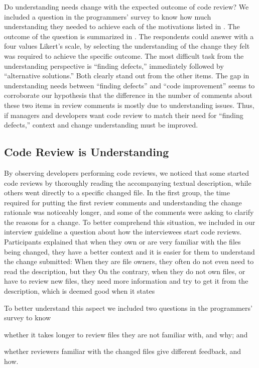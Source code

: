 Do understanding needs change with the expected outcome of code review? We included a question in the programmers’ survey to know how much understanding they needed to achieve each of the motivations listed in . The outcome of the question is summarized in . The respondents could answer with a four values Likert's scale, by selecting the understanding of the change they felt was required to achieve the specific outcome. The most difficult task from the understanding perspective is ``finding defects,'' immediately followed by ``alternative solutions.'' Both clearly stand out from the other items. The gap in understanding needs between ``finding defects'' and ``code improvement'' seems to corroborate our hypothesis that the difference in the number of comments about these two items in review comments is mostly due to understanding issues. Thus, if managers and developers want code review to match their need for ``finding defects,'' context and change understanding must be improved.


\subsection{Code Review is Understanding}

By observing developers performing code reviews, we noticed that some started code reviews by thoroughly reading the accompanying textual description, while others went directly to a specific changed file. In the first group, the time required for putting the first review comments and understanding the change rationale was noticeably longer, and some of the comments were asking to clarify the reasons for a change. To better comprehend this situation, we included in our interview guideline a question about how the interviewees start code reviews. Participants explained that when they own or are very familiar with the files being changed, they have a better context and it is easier for them to understand the change submitted:  When they are file owners, they often do not even need to read the description, but they  On the contrary, when they do not own files, or have to review new files, they need more information and try to get it from the description, which is deemed good when it states 

To better understand this aspect we included two questions in the programmers' survey to know \begin{inparaenum}[(1)]
\item whether it takes longer to review files they are not familiar with, and why; and 
\item whether reviewers familiar with the changed files give different feedback, and how. \end{inparaenum}

